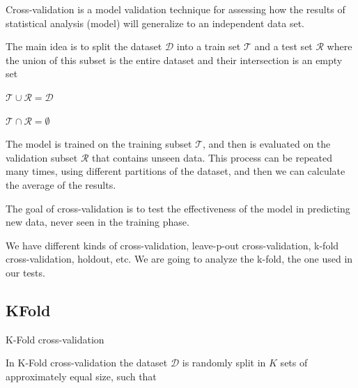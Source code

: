 Cross-validation is a model validation technique for assessing how the results of statistical analysis (model) will generalize to an independent data set.

The main idea is to split the dataset $\mathcal{D}$ into a train set $\mathcal{T}$ and a test set $\mathcal{R}$ where the union of this subset is the entire dataset and their intersection is an empty set \cite{ghojogh2019theory}

 $\mathcal{T} \cup \mathcal{R} = \mathcal{D} $
 
 $\mathcal{T} \cap \mathcal{R} = \emptyset $
 

The model is trained on the training subset $\mathcal{T}$, and then is evaluated on the validation subset $\mathcal{R}$ that contains unseen data.
This process can be repeated many times, using different partitions of the dataset, and then we can calculate the average of the results.

The goal of cross-validation is to test the effectiveness of the model in predicting new data, never seen in the training phase.

We have different kinds of cross-validation, leave-p-out cross-validation, k-fold cross-validation, holdout, etc. We are going to analyze the k-fold, the one used in our tests.





\subsection{KFold}

\begin{algorithm}
	\caption{K-Fold cross-validation}\label{alg:kfoldAlg}
	\begin{algorithmic}[1]
		 
		
		
		\EndFor
		
	\end{algorithmic}
\end{algorithm}

In K-Fold cross-validation the dataset $\mathcal{D}$ is randomly split in $K$ sets of approximately equal size, such that \cite{ghojogh2019theory} \cite{kuhn2013applied}

